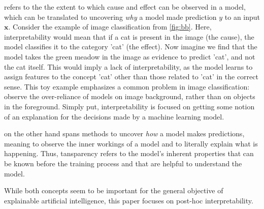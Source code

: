  refers to the the extent to which cause and effect can be observed in a model, which can be translated to uncovering \textit{why} a model made prediction $y$ to an input $\mathbf{x}$. Consider the example of image classification from \autoref{fig:bb}. Here, interpretability would mean that if a cat is present in the image (the cause), the model classifies it to the category 'cat' (the effect). Now imagine we find that the model takes the green meadow in the image as evidence to predict 'cat', and not the cat itself. 
This would imply a lack of interpretability, as the model learns to assign features to the concept 'cat' other than those related to 'cat' in the correct sense. This toy example emphasizes a common problem in image classification: \cite{xiao2020noise} observe the over-reliance of models on image background, rather than on objects in the foreground. %
Simply put, interpretability is focused on getting some notion of an explanation for the decisions made by a machine learning model.

 on the other hand spans methods to uncover \textit{how} a model makes predictions, meaning to observe the inner workings of a model and to literally explain what is happening. Thus, tansparency refers to the model's inherent properties that can be known before the training process and that are helpful to understand the model.

\par\smallskip
While both concepts seem to be important for the general objective of explainable artificial intelligence, this paper focuses on post-hoc interpretability. 





